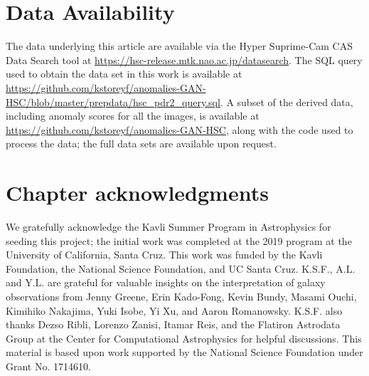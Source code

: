\section*{Data Availability}

The data underlying this article are available via the Hyper Suprime-Cam CAS Data Search tool at \url{https://hsc-release.mtk.nao.ac.jp/datasearch}.
The SQL query used to obtain the data set in this work is available at \url{https://github.com/kstoreyf/anomalies-GAN-HSC/blob/master/prepdata/hsc_pdr2_query.sql}.
A subset of the derived data, including anomaly scores for all the images, is available at \url{https://github.com/kstoreyf/anomalies-GAN-HSC}, along with the code used to process the data; the full data sets are available upon request.

\section{Chapter acknowledgments}

We gratefully acknowledge the Kavli Summer Program in Astrophysics for seeding this project; the initial work was completed at the 2019 program at the University of California, Santa Cruz.
This work was funded by the Kavli Foundation, the National Science Foundation, and UC Santa Cruz.
K.S.F., A.L. and Y.L. are grateful for valuable insights on the interpretation of galaxy observations from Jenny Greene, Erin Kado-Fong, Kevin Bundy, Masami Ouchi, Kimihiko Nakajima, Yuki Isobe, Yi Xu, and Aaron Romanowsky.
K.S.F. also thanks Dezso Ribli, Lorenzo Zanisi, Itamar Reis, and the Flatiron Astrodata Group at the Center for Computational Astrophysics for helpful discussions. 
This material is based upon work supported by the National Science Foundation under Grant No. 1714610.



